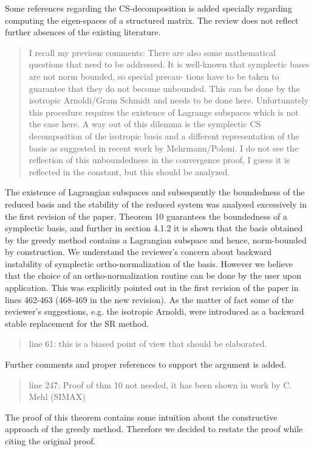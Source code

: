 \documentclass[a4paper]{article}
\newcommand{\breview}{\begin{quotation}\begin{bf}\noindent}
\newcommand{\ereview}{\end{bf}\end{quotation}}
\begin{document}
Some references regarding the CS-decomposition is added specially regarding computing the eigen-spaces of a structured matrix. The review does not reflect further absences of the existing literature.


\breview
I recall my previous comments: There are also some mathematical questions that need to be addressed. It is well-known that symplectic bases are not norm bounded, so special precau- tions have to be taken to guarantee that they do not become unbounded. This can be done by the isotropic Arnoldi/Gram Schmidt and needs to be done here. Unfortunately this procedure requires the existence of Lagrange subspaces which is not the case here. A way out of this dilemma is the symplectic CS decomposition of the isotropic basis and a different representation of the basis as suggested in recent work by Mehrmann/Poloni.
I do not see the reflection of this unboundedness in the convergence proof, I guess it is reflected in the constant, but this should be analyzed.
\ereview

The existence of Lagrangian subspaces and subsequently the boundedness of the reduced basis and the stability of the reduced system was analysed excessively in the first revision of the paper. Theorem 10 guarantees the boundedness of a symplectic basis, and further in section 4.1.2 it is shown that the basis obtained by the greedy method contains a Lagrangian subspace and hence, norm-bounded by construction. We understand the reviewer's concern about backward instability of symplectic ortho-normalization of the basis. However we believe that the choice of an ortho-normalization routine can be done by the user upon application. This was explicitly pointed out in the first revision of the paper in lines 462-463 (468-469 in the new revision). As the matter of fact some of the reviewer's suggestions, e.g. the isotropic Arnoldi, were introduced as a backward stable replacement for the SR method.

\breview
line 61: this is a biased point of view that should be elaborated.
\ereview

Further comments and proper references to support the argument is added. 

\breview
line 247: Proof of thm 10 not needed, it has been shown in work by C. Mehl (SIMAX)
\ereview

The proof of this theorem contains some intuition about the constructive approach of the greedy method. Therefore we decided to restate the proof while citing the original proof.
\end{document}
